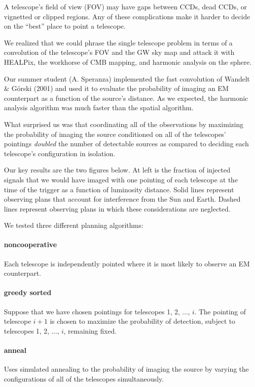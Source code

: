 \documentclass[portrait]{a0poster}
\begin{document}
A telescope’s field of view (FOV) may have gaps between CCDs, dead CCDs, or vignetted or clipped regions.  Any of these complications make it harder to decide on the “best” place to point a telescope.

We realized that we could phrase the single telescope problem in terms of a convolution of the telescope’s FOV and the GW sky map and attack it with HEALPix, the workhorse of CMB mapping, and harmonic analysis on the sphere.

Our summer student (A. Speranza) implemented the fast convolution of Wandelt \& Górski (2001) and used it to evaluate the probability of imaging an EM counterpart as a function of the source’s distance.  As we expected, the harmonic analysis algorithm was much faster than the spatial algorithm.

What surprised us was that coordinating all of the observations by maximizing the probability of imaging the source conditioned on all of the telescopes’ pointings \emph{doubled} the number of detectable sources as compared to deciding each telescope’s configuration in isolation.

\framebreak

Our key results are the two figures below.  At left is the fraction of injected signals that we would have imaged with one pointing of each telescope at the time of the trigger as a function of luminosity distance.  Solid lines represent observing plans that account for interference from the Sun and Earth.  Dashed lines represent observing plans in which these considerations are neglected.

We tested three different planning algorithms:

\paragraph{\color{red}noncooperative}
Each telescope is independently pointed where it is most likely to observe an EM counterpart.

\paragraph{\color{green!50!black}greedy sorted}
Suppose that we have chosen pointings for telescopes 1, 2, $\dots$, $i$.  The pointing of telescope $i+1$ is chosen to maximize the probability of detection, subject to telescopes 1, 2, $\dots$, $i$, remaining fixed.

\paragraph{\color{blue}anneal}
Uses simulated annealing to the probability of imaging the source by varying the configurations of all of the telescopes simultaneously.
\end{document}
